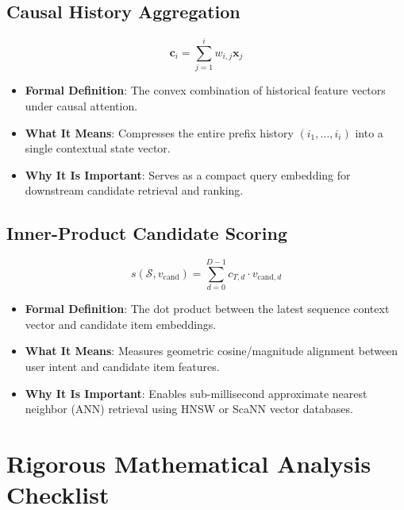 \documentclass[11pt,a4paper]{article}
\theoremstyle{definition}
\begin{document}
\subsection{Causal History Aggregation}
{\boldmath
\begin{equation}
\mathbf{c}_i = \sum_{j=1}^i w_{i, j} \mathbf{x}_j
\end{equation}
}
\begin{itemize}
    \item \textbf{Formal Definition}: The convex combination of historical feature vectors under causal attention.
    \item \textbf{What It Means}: Compresses the entire prefix history $(i_1, \dots, i_i)$ into a single contextual state vector.
    \item \textbf{Why It Is Important}: Serves as a compact query embedding for downstream candidate retrieval and ranking.
\end{itemize}

\subsection{Inner-Product Candidate Scoring}
{\boldmath
\begin{equation}
s(\mathcal{S}, v_{\text{cand}}) = \sum_{d=0}^{D-1} c_{T, d} \cdot v_{\text{cand}, d}
\end{equation}
}
\begin{itemize}
    \item \textbf{Formal Definition}: The dot product between the latest sequence context vector and candidate item embeddings.
    \item \textbf{What It Means}: Measures geometric cosine/magnitude alignment between user intent and candidate item features.
    \item \textbf{Why It Is Important}: Enables sub-millisecond approximate nearest neighbor (ANN) retrieval using HNSW or ScaNN vector databases.
\end{itemize}

\section{Rigorous Mathematical Analysis Checklist}
\end{document}
